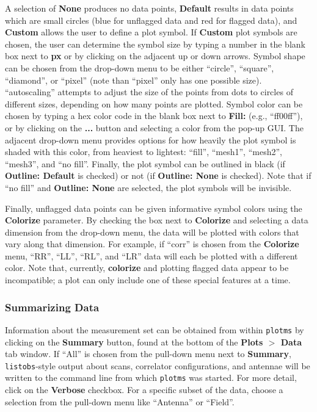 A selection of {\bf None} produces no data points, {\bf Default}
results in data points which are small circles (blue for unflagged
data and red for flagged data), and {\bf Custom} allows the user to
define a plot symbol. If {\bf Custom} plot symbols are chosen, the
user can determine the symbol size by typing a number in the blank box
next to {\bf px} or by clicking on the adjacent up or down
arrows. Symbol shape can be chosen from the drop-down menu to be
either ``circle'', ``square'', ``diamond'', or ``pixel'' (note than
``pixel'' only has one possible size). ``autoscaling'' attempts to
adjust the size of the points from dots to circles of different sizes,
depending on how many points are plotted. Symbol color can be chosen
by typing a hex color code in the blank box next to {\bf Fill:} (e.g.,
``ff00ff''), or by clicking on the {\bf ...}  button and selecting a
color from the pop-up GUI. The adjacent drop-down menu provides
options for how heavily the plot symbol is shaded with this color,
from heaviest to lightest: ``fill'', ``mesh1'', ``mesh2'', ``mesh3'',
and ``no fill''. Finally, the plot symbol can be outlined in black (if
{\bf Outline: Default} is checked) or not (if {\bf Outline: None} is
checked). Note that if ``no fill'' and {\bf Outline: None} are
selected, the plot symbols will be invisible.

Finally, unflagged data points can be given informative symbol colors
using the {\bf Colorize} parameter. By checking the box next to {\bf
  Colorize} and selecting a data dimension from the drop-down menu,
the data will be plotted with colors that vary along that
dimension. For example, if ``corr'' is chosen from the {\bf Colorize}
menu, ``RR'', ``LL'', ``RL'', and ``LR'' data will each be plotted
with a different color. Note that, currently, {\bf colorize} and
plotting flagged data appear to be incompatible; a plot can only
include one of these special features at a time.


\subsubsection{Summarizing Data}
\label{section:edit.plot.plotms.summary}

Information about the measurement set can be obtained from within {\tt plotms} by clicking on the {\bf Summary} button, found at the bottom of the {\bf Plots $>$ Data} tab window. If ``All'' is chosen from the pull-down menu next to {\bf Summary}, {\tt listobs}-style output about scans, correlator configurations, and antennae will be written to the command line from which {\tt plotms} was started. For more detail, click on the {\bf Verbose} checkbox. For a specific subset of the data, choose a selection from the pull-down menu like ``Antenna'' or ``Field''.

